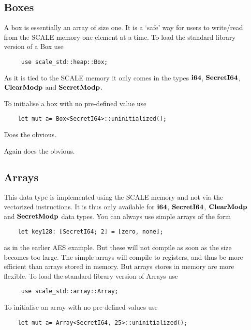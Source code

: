 

\subsection{Boxes}
A box is essentially an array of size one. It is a `safe' way for users
to write/read from the SCALE memory one element at a time.
To load the standard library version of a Box use
\begin{lstlisting}
     use scale_std::heap::Box;
\end{lstlisting}
As it is tied to the SCALE memory it only comes in the
types  $\mathbf{i64}$, $\mathbf{SecretI64}$, $\mathbf{ClearModp}$ and $\mathbf{SecretModp}$.

To initialise a box with no pre-defined value use
\begin{lstlisting}
    let mut a= Box<SecretI64>::uninitialized();
\end{lstlisting}

Does the obvious.

Again does the obvious.


\subsection{Arrays}
This data type is implemented using the SCALE memory and not
via the vectorized instructions.
It is thus only available for $\mathbf{i64}$, $\mathbf{SecretI64}$, $\mathbf{ClearModp}$
and $\mathbf{SecretModp}$ data types.
You can always use simple arrays of the form
\begin{lstlisting}
    let key128: [SecretI64; 2] = [zero, none];
\end{lstlisting}
as in the earlier AES example. But these will not compile as
soon as the size becomes too large. The simple arrays will
compile to registers, and thus be more efficient than arrays
stored in memory. But arrays stores in memory are more flexible.
To load the standard library version of Arrays use
\begin{lstlisting}
     use scale_std::array::Array;
\end{lstlisting}

To initialise an array with no pre-defined values use
\begin{lstlisting}
    let mut a= Array<SecretI64, 25>::uninitialized();
\end{lstlisting}


